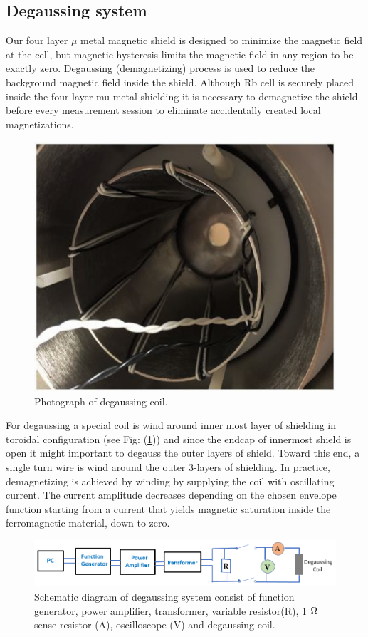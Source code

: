\subsection{Degaussing system\label{sec:Degaussing}}

Our four layer $\mu$ metal magnetic shield is designed to minimize the
magnetic field at the cell, but magnetic hysteresis limits the
magnetic field in any region to be exactly zero. Degaussing
(demagnetizing) process is used to reduce the background magnetic
field inside the shield. Although Rb cell is securely placed inside
the four layer mu-metal shielding it is necessary to demagnetize the
shield before every measurement session to eliminate accidentally
created local magnetizations.

\begin{figure}%
\centering
\includegraphics[width=0.6\linewidth]{figures/degaussing_coil.png}
\caption{Photograph of degaussing coil.\label{fig:degaussing_ccoil.}}
\end{figure}

For degaussing a special coil is wind around inner most layer of shielding  in toroidal configuration (see Fig: (\ref{fig:degaussing_ccoil.}))
and  since the endcap of innermost shield is open it might important to degauss the outer layers of shield. Toward this end, a single turn wire is wind around the outer 3-layers of shielding.
In practice, demagnetizing is achieved by winding by supplying the coil with oscillating current. The current amplitude decreases depending on the chosen envelope function starting from a current that yields magnetic saturation inside the ferromagnetic material, down to zero. 
\begin{figure}[h]
\centering
\includegraphics[width=1.0\linewidth]{figures/degaussing_system}
\caption{Schematic diagram of degaussing system consist of function generator, power amplifier, transformer, variable resistor(R), 1 $\ohm$ sense resistor (A), oscilloscope (V) and degaussing coil. \label{fig:schematic-of-degaussing_system.}}
\end{figure}

